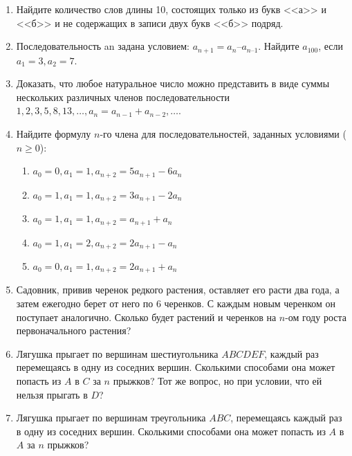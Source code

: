 \begin{enumerate}
\item Найдите количество слов длины 10, состоящих только из букв <<а>> и <<б>> и не содержащих в записи двух букв <<б>> подряд. 

\item Последовательность an задана условием: $a_{n+1} = a_n – a_{n–1}$.
      Найдите $a_{100}$, если $a_1 = 3,  a_2 = 7$.

\item Доказать, что любое натуральное число можно представить в виде суммы нескольких различных членов последовательности $1, 2, 3, 5, 8, 13, \ldots, a_n = a_{n - 1} + a_{n - 2}, \ldots$. 

\item Найдите формулу $n$-го члена для последовательностей, заданных условиями ($n \ge 0$): 
  \begin{enumerate}
    \item $a_0 = 0, a_1 = 1, a_{n + 2} = 5a_{n + 1} - 6a_n$
    \item $a_0 = 1, a_1 = 1, a_{n + 2} = 3a_{n + 1} - 2a_n$
    \item $a_0 = 1, a_1 = 1, a_{n + 2} = a_{n + 1} + a_n$
    \item $a_0 = 1, a_1 = 2, a_{n + 2} = 2a_{n + 1} - a_n$
    \item $a_0 = 0, a_1 = 1, a_{n + 2} = 2a_{n + 1} + a_n$
  \end{enumerate}

\item Садовник, привив черенок редкого растения, оставляет его расти два года, а затем ежегодно берет от него по $6$ черенков. С каждым новым черенком он поступает аналогично. Сколько будет растений и черенков на $n$-ом году роста первоначального растения? 

\item Лягушка прыгает по вершинам шестиугольника $ABCDEF$, каждый раз перемещаясь в одну из соседних вершин. Сколькими способами она может попасть из $A$ в $C$ за $n$ прыжков? Тот же вопрос, но при условии, что ей нельзя прыгать в $D$? 

\item Лягушка прыгает по вершинам треугольника $ABC$, перемещаясь каждый раз в одну из соседних вершин. Сколькими способами она может попасть из $A$ в $A$ за $n$ прыжков?


\end{enumerate}
